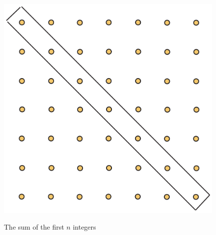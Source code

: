 \begin{figure}
\begin{center}
\includegraphics[scale=.3]{string-figs/3012-fig25}\\
\caption{The sum of the first $n$ integers}
\label{fig:squaredots}
\end{center}
\end{figure}


